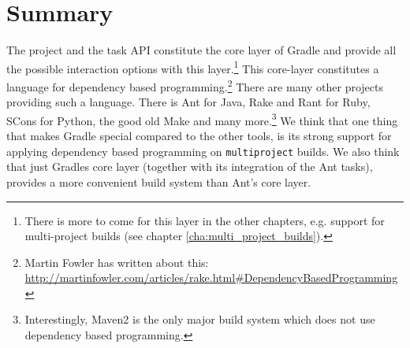 \section{Summary} %
\label{sec:summary}
The project and the task API constitute the core layer of Gradle and provide all the possible interaction options with this layer.\footnote{There is more to come for this layer in the other chapters, e.g. support for multi-project builds (see chapter \ref{cha:multi_project_builds}).} This core-layer constitutes a language for dependency based programming.\footnote{Martin Fowler has written about this: \url{http://martinfowler.com/articles/rake.html\#DependencyBasedProgramming}} There are many other projects providing such a language. There is Ant for Java, Rake and Rant for Ruby, SCons for Python, the good old Make and many more.\footnote{Interestingly, Maven2 is the only major build system which does not use dependency based programming.} We think that one thing that makes Gradle special compared to the other tools, is its strong support for applying dependency based programming on \texttt{multiproject} builds. We also think that just Gradles core layer (together with its integration of the Ant tasks), provides a more convenient build system than Ant's core layer.

